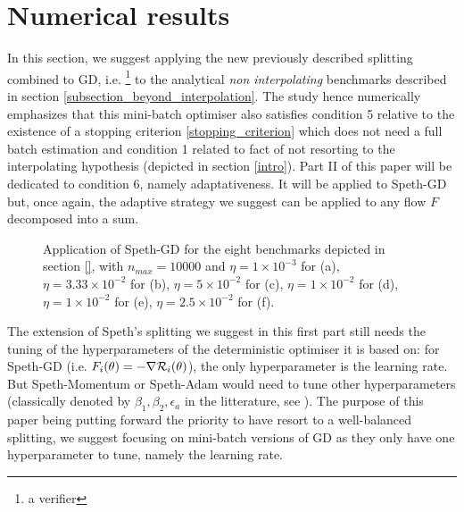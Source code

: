 \section{Numerical results}
\label{num_res}




In this section, we suggest applying the new previously described splitting combined to GD, i.e. \footnote{a verifier} to the 
analytical {\em non interpolating} benchmarks described in section \ref{subsection_beyond_interpolation}. The study hence numerically emphasizes that this mini-batch optimiser also
satisfies condition 5 relative to the existence of a stopping criterion \eqref{stopping_criterion} which does not need a full batch estimation and condition 1 related to fact of
not resorting to the interpolating hypothesis (depicted in section \ref{intro}). Part II of this paper will be dedicated to condition 6, namely
adaptativeness. It will be applied to Speth-GD but, once again, the adaptive strategy we suggest can be applied to any flow $F$ decomposed into a sum. \\ 


\begin{figure}[h!]
	\centering
	\scalebox{0.45}{}
        \caption{
          Application of Speth-GD for the eight benchmarks depicted in section \ref{}, with $n_{max}=10000$ and 
        $\eta = 1\times 10^{-3}$ for \exThree (a), 
  $\eta = 3.33\times 10^{-2}$ for \exFour (b), 
  $\eta = 5 \times 10^{-2}$ for \exFive (c), 
  $\eta = 1 \times 10^{-2}$ for \exSix (d), 
  $\eta = 1 \times 10^{-2}$ for \exSeven (e), 
  $\eta = 2.5 \times 10^{-2}$ for \exHeight (f). 
}
	\label{SPETH_exs}
\end{figure}


The extension of Speth's splitting we suggest in this first part still needs the tuning of the hyperparameters of the deterministic optimiser it is based on: for Speth-GD (i.e.
$F_i(\theta)=-\nabla \mathcal{R}_i(\theta)$), the only hyperparameter is the
learning rate.  But Speth-Momentum or Speth-Adam would need to tune other hyperparameters (classically denoted by $\beta_1,\beta_2, \epsilon_a$ in the litterature, see
\cite{Bilel_thesis}). 
The purpose of this paper being putting forward the priority to have resort to a well-balanced splitting, we suggest focusing on mini-batch versions of GD as they only have one
hyperparameter to tune, namely the learning rate. \\

